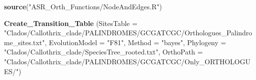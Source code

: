 \documentclass[
]{book}
\newenvironment{Shaded}{\begin{snugshade}}{\end{snugshade}}
\newcommand{\AttributeTok}[1]{\textcolor[rgb]{0.13,0.29,0.53}{#1}}
\newcommand{\FunctionTok}[1]{\textcolor[rgb]{0.13,0.29,0.53}{\textbf{#1}}}
\newcommand{\NormalTok}[1]{#1}
\newcommand{\StringTok}[1]{\textcolor[rgb]{0.31,0.60,0.02}{#1}}
\begin{document}
\begin{Shaded}
\begin{Highlighting}[]
\FunctionTok{source}\NormalTok{(}\StringTok{"ASR\_Orth\_Functions/NodeAndEdges.R"}\NormalTok{)}

\FunctionTok{Create\_Transition\_Table}\NormalTok{ (}\AttributeTok{SitesTable =} \StringTok{"Clados/Callothrix\_clade/PALINDROMES/GCGATCGC/Orthologues\_Palindrome\_sites.txt"}\NormalTok{,}
                                \AttributeTok{EvolutionModel =} \StringTok{"F81"}\NormalTok{,}
                                \AttributeTok{Method =} \StringTok{"bayes"}\NormalTok{,}
                                \AttributeTok{Phylogeny =} \StringTok{"Clados/Callothrix\_clade/SpeciesTree\_rooted.txt"}\NormalTok{,}
                                \AttributeTok{OrthoPath =} \StringTok{"Clados/Callothrix\_clade/PALINDROMES/GCGATCGC/Only\_ORTHOLOGUES/"}\NormalTok{)}
\end{Highlighting}
\end{Shaded}


  
\end{document}
